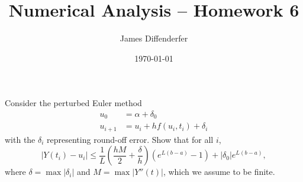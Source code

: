 \documentclass[8pt]{article}
\title{Numerical Analysis -- Homework 6}
\author{James Diffenderfer}
\date{\today}
\theoremstyle{definition}
\newenvironment{exercise}[1]
  {\renewcommand\theinnerexercise{#1}\innerexercise}
  {\endinnerexercise}
\begin{document}
\maketitle


\begin{exercise}{1}
Consider the perturbed Euler method 
\begin{align*}
u_0 &= \alpha + \delta_0 \\
u_{i+1} &= u_i + h f (u_i, t_i) + \delta_i
\end{align*}
with the $\delta_i$ representing round-off error. Show that for all $i$, $$|Y(t_i) - u_i| \leq \frac{1}{L} \left( \frac{hM}{2} + \frac{\delta}{h} \right) \left( e^{L(b-a)} - 1 \right) + | \delta_0| e^{L(b-a)},$$ where $\delta = \max | \delta_i |$ and $M = \max |Y''(t)|$, which we assume to be finite.
\end{exercise}
\end{document}
